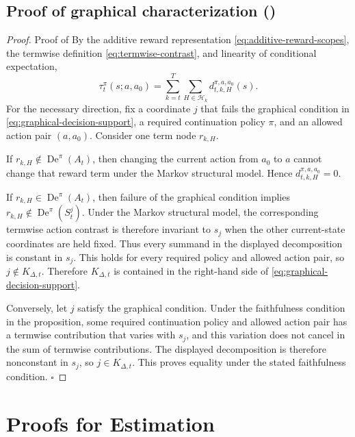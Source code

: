\documentclass[opre,nonblindrev]{informs4}
\newcommand{\blipadv}{\tau}
\renewcommand{\qed}{\unskip\nobreak\hfill\ensuremath{\square}}
\begin{document}
\subsection{Proof of graphical characterization ()}
\begin{proof}{Proof of }
By the additive reward representation \eqref{eq:additive-reward-scopes},
the termwise definition \eqref{eq:termwise-contrast}, and linearity of
conditional expectation,
\[
\blipadv_t^\pi(s;a,a_0)
=
\sum_{k=t}^{T}\sum_{H\in\mathcal H_k}
d_{t,k,H}^{\pi,a,a_0}(s).
\]
For the necessary direction, fix a coordinate \(j\) that fails the graphical
condition in \eqref{eq:graphical-decision-support}, a required continuation
policy \(\pi\), and an allowed action pair \((a,a_0)\). Consider one term node
\(r_{k,H}\).

If \(r_{k,H}\notin\operatorname{De}^{\pi}(A_t)\), then changing the current
action from \(a_0\) to \(a\) cannot change that reward term under the Markov
structural model. Hence $d_{t,k,H}^{\pi,a,a_0}=0$.

If \(r_{k,H}\in\operatorname{De}^{\pi}(A_t)\), then failure of the graphical
condition implies
$r_{k,H}\notin\operatorname{De}^{\pi}(S_t^j)$.
Under the Markov structural model, the corresponding termwise action
contrast is therefore invariant to \(s_j\) when the other current-state
coordinates are held fixed. Thus every summand in the displayed
decomposition is constant in \(s_j\). This holds for every required policy
and allowed action pair, so \(j\notin K_{\Delta,t}\). Therefore
$K_{\Delta,t}$ is contained in the right-hand side of
\eqref{eq:graphical-decision-support}.

Conversely, let \(j\) satisfy the graphical condition. Under the faithfulness
condition in the proposition, some required continuation policy and allowed
action pair has a termwise contribution that varies with \(s_j\), and this
variation does not cancel in the sum of termwise contributions. The displayed
decomposition is therefore nonconstant in \(s_j\), so \(j\in K_{\Delta,t}\).
This proves equality under the stated faithfulness condition. \qed
\end{proof}


\section{Proofs for Estimation }\label{apx-sec-proofs-estimation}
\end{document}
